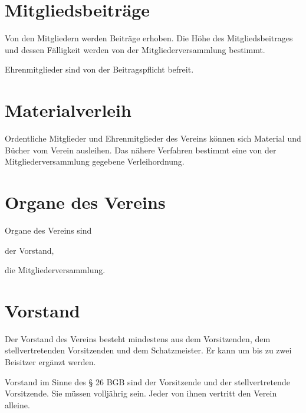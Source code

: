 \section{Mitgliedsbeiträge}
\begin{para}
	\item Von den Mitgliedern werden Beiträge erhoben. Die Höhe des Mitgliedsbeitrages und dessen Fälligkeit werden von der Mitgliederversammlung bestimmt.
	\item Ehrenmitglieder sind von der Beitragspflicht befreit.
\end{para}

\section{Materialverleih}
\begin{para}
	\item Ordentliche Mitglieder und Ehrenmitglieder des Vereins können sich Material und Bücher vom Verein ausleihen. Das nähere Verfahren bestimmt eine von der Mitgliederversammlung gegebene Verleihordnung.
\end{para}

\section{Organe des Vereins}
Organe des Vereins sind
\begin{para}
	\item der Vorstand,
	\item die Mitgliederversammlung.
\end{para}

\section{Vorstand}
\begin{para}
	\item Der Vorstand des Vereins besteht mindestens aus dem Vorsitzenden, dem stellvertretenden Vorsitzenden und dem Schatzmeister.
	Er kann um bis zu zwei Beisitzer ergänzt werden.
	\item Vorstand im Sinne des § 26 BGB sind der Vorsitzende und der stellvertretende Vorsitzende. Sie müssen volljährig sein. Jeder von ihnen vertritt den Verein alleine.
\end{para}

